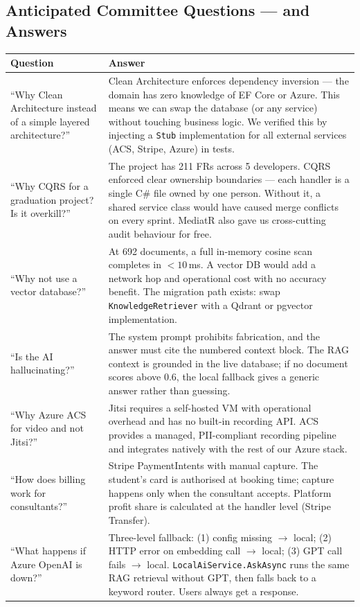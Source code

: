 \documentclass[11pt,a4paper]{article}
\begin{document}
\subsection{Anticipated Committee Questions --- and Answers}

\begin{center}
\begin{tabularx}{\linewidth}{p{5.8cm}X}
\toprule
\textbf{Question} & \textbf{Answer}\\
\midrule
``Why Clean Architecture instead of a simple layered architecture?'' &
  Clean Architecture enforces dependency inversion --- the domain has zero
  knowledge of EF Core or Azure. This means we can swap the database (or any
  service) without touching business logic. We verified this by injecting a
  \texttt{Stub} implementation for all external services (ACS, Stripe, Azure) in tests.\\[4pt]
``Why CQRS for a graduation project? Is it overkill?'' &
  The project has 211 FRs across 5 developers. CQRS enforced clear
  ownership boundaries --- each handler is a single C\# file owned by one person.
  Without it, a shared service class would have caused merge conflicts on every sprint.
  MediatR also gave us cross-cutting audit behaviour for free.\\[4pt]
``Why not use a vector database?'' &
  At 692 documents, a full in-memory cosine scan completes in $<10$\,ms.
  A vector DB would add a network hop and operational cost with no accuracy benefit.
  The migration path exists: swap \texttt{KnowledgeRetriever} with
  a Qdrant or pgvector implementation.\\[4pt]
``Is the AI hallucinating?'' &
  The system prompt prohibits fabrication, and the answer must cite
  the numbered context block. The RAG context is grounded in the live database;
  if no document scores above 0.6, the local fallback gives a generic answer
  rather than guessing.\\[4pt]
``Why Azure ACS for video and not Jitsi?'' &
  Jitsi requires a self-hosted VM with operational overhead and has no
  built-in recording API. ACS provides a managed, PII-compliant recording
  pipeline and integrates natively with the rest of our Azure stack.\\[4pt]
``How does billing work for consultants?'' &
  Stripe PaymentIntents with manual capture. The student's card is authorised
  at booking time; capture happens only when the consultant accepts.
  Platform profit share is calculated at the handler level (Stripe Transfer).\\[4pt]
``What happens if Azure OpenAI is down?'' &
  Three-level fallback: (1) config missing $\rightarrow$ local; (2) HTTP error on
  embedding call $\rightarrow$ local; (3) GPT call fails $\rightarrow$ local.
  \texttt{LocalAiService.AskAsync} runs the same RAG retrieval without GPT, then
  falls back to a keyword router. Users always get a response.\\
\bottomrule
\end{tabularx}
\end{center}
\end{document}
